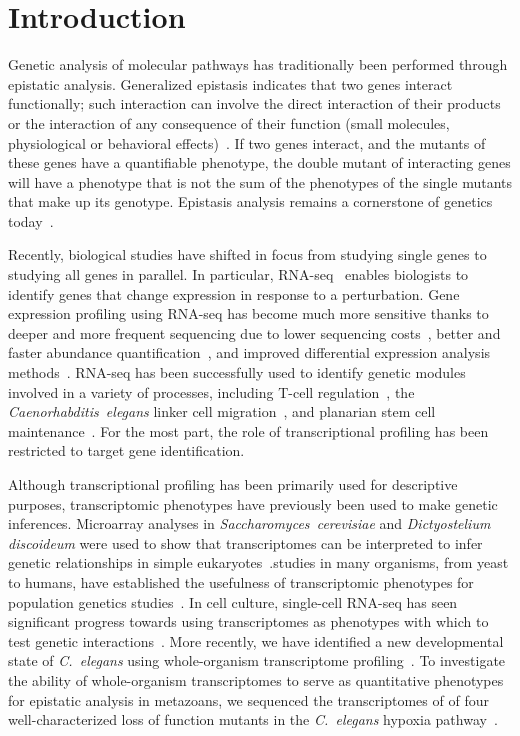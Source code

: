 \documentclass[10pt, onecolumn]{article}
\newcommand{\cel}{\emph{C.~elegans}}
\begin{document}
\section*{Introduction}
\label{sec:introduction}
Genetic analysis of molecular pathways has traditionally been performed
through epistatic analysis. Generalized epistasis indicates that two genes interact
functionally; such interaction can involve the direct interaction of their
products or the interaction of any consequence of their function (small molecules,
physiological or behavioral effects)~\cite{Huang2006}. If two
genes interact, and the mutants of these genes have a quantifiable phenotype,
the double mutant of interacting genes will have a phenotype that is not the sum
of the phenotypes of the single mutants that make up its genotype. Epistasis
analysis remains a cornerstone of genetics today~\cite{Phillips2008}.


Recently, biological studies have shifted in focus from studying single
genes to studying all genes in parallel. In particular,
RNA-seq~\cite{Mortazavi2008} enables biologists to
identify genes that change expression in response to a perturbation. Gene expression
profiling using RNA-seq has become much more sensitive thanks to deeper and more
frequent sequencing due to lower sequencing costs~\cite{Metzker2010},
better and faster abundance quantification~\cite{Patro2014,Bray2016,Patro2015},
and improved differential expression analysis
methods~\cite{Pimentel2016,Trapnell2013}. RNA-seq has been
successfully used to identify genetic modules involved in a variety of processes,
including T-cell regulation~\cite{Singer2016,Shalek2013}, the
\emph{Caenorhabditis~elegans} linker cell migration~\cite{Schwarz2012}, and
planarian stem cell maintenance~\cite{VanWolfswinkel2014,Scimone2014}. For the
most part, the role of transcriptional profiling has been restricted to target
gene identification.

Although transcriptional profiling has been primarily used for descriptive purposes,
transcriptomic phenotypes have previously been used to make genetic inferences.
Microarray analyses in \emph{Saccharomyces~cerevisiae} and
\emph{Dictyostelium discoideum} were used to show
that transcriptomes can be interpreted to infer genetic relationships in simple
eukaryotes~\cite{Hughes2000, VanDriessche2005}.\@eQTL studies in
many organisms, from yeast to humans, have established the usefulness of
transcriptomic phenotypes for population genetics studies~\cite{Brem2002,Schadt2003,
Li2006,King2014}. In cell culture, single-cell RNA-seq has seen significant
progress towards using transcriptomes as phenotypes with which to test genetic
interactions~\cite{Adamson2016,Dixit2016}.
More recently, we have identified a new developmental state
of \cel{} using whole-organism transcriptome profiling~\cite{Angeles-Albores2016a}.
To investigate the ability of whole-organism transcriptomes to serve as quantitative
phenotypes for epistatic analysis in metazoans, we sequenced the transcriptomes of
of four well-characterized loss of function mutants in the \cel{} hypoxia
pathway~\cite{Epstein2001,Shen2006,Shao2009,Jiang2001}.
\end{document}
